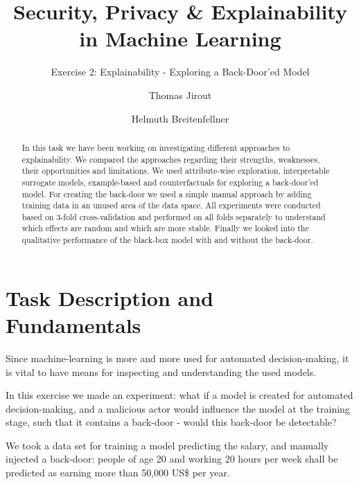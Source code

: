 \documentclass[sigconf,nonacm]{acmart}
\begin{document}
\title{Security, Privacy \& Explainability in Machine Learning}
\subtitle{Exercise 2: Explainability - Exploring a Back-Door'ed Model}
  \author{Thomas Jirout}
  \author{Helmuth Breitenfellner}

\providecommand{\tightlist}{%
  \setlength{\itemsep}{0pt}\setlength{\parskip}{0pt}}

\begin{abstract}
In this task we have been working on investigating different approaches
to explainability. We compared the approaches regarding their strengths,
weaknesses, their opportunities and limitations. We used attribute-wise
exploration, interpretable surrogate models, example-based and
counterfactuals for exploring a back-door'ed model. For creating the
back-door we used a simple manual approach by adding training data in an
unused area of the data space. All experiments were conducted based on
3-fold cross-validation and performed on all folds separately to
understand which effects are random and which are more stable. Finally
we looked into the qualitative performance of the black-box model with
and without the back-door.
\end{abstract}

\maketitle

\hypertarget{task-description-and-fundamentals}{%
\section{Task Description and
Fundamentals}\label{task-description-and-fundamentals}}

Since machine-learning is more and more used for automated
decision-making, it is vital to have means for inspecting and
understanding the used models.

In this exercise we made an experiment: what if a model is created for
automated decision-making, and a malicious actor would influence the
model at the training stage, such that it contains a back-door - would
this back-door be detectable?

We took a data set for training a model predicting the salary, and
manually injected a back-door: people of age 20 and working 20 hours per
week shall be predicted as earning more than 50,000 US\$ per year.
\end{document}
